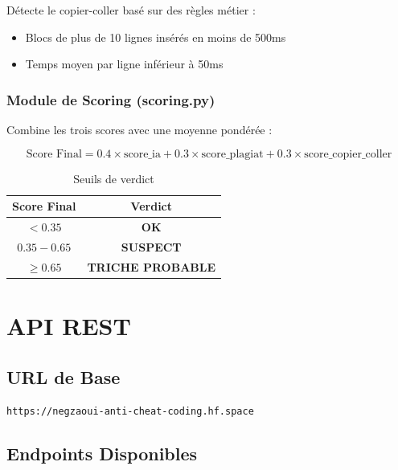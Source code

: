 \documentclass[12pt,a4paper]{report}
\begin{document}
Détecte le copier-coller basé sur des règles métier :

\begin{itemize}
    \item Blocs de plus de 10 lignes insérés en moins de 500ms
    \item Temps moyen par ligne inférieur à 50ms
\end{itemize}

\subsection{Module de Scoring (scoring.py)}

Combine les trois scores avec une moyenne pondérée :

\begin{equation}
\text{Score Final} = 0.4 \times \text{score\_ia} + 0.3 \times \text{score\_plagiat} + 0.3 \times \text{score\_copier\_coller}
\end{equation}

\begin{table}[H]
\centering
\renewcommand{\arraystretch}{1.3}
\begin{tabular}{c c}
\toprule
\textbf{Score Final} & \textbf{Verdict} \\
\midrule
$< 0.35$ & \textcolor{secondarygreen}{\textbf{OK}} \\
$0.35 - 0.65$ & \textcolor{warningorange}{\textbf{SUSPECT}} \\
$\geq 0.65$ & \textcolor{dangerred}{\textbf{TRICHE PROBABLE}} \\
\bottomrule
\end{tabular}
\caption{Seuils de verdict}
\end{table}

\chapter{API REST}

\section{URL de Base}

\begin{center}
\Large\texttt{https://negzaoui-anti-cheat-coding.hf.space}
\end{center}

\section{Endpoints Disponibles}
\end{document}
